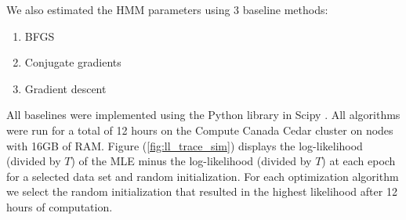 We also estimated the HMM parameters using 3 baseline methods:
%
\begin{enumerate}
    \item BFGS \citep{Fletcher:2000}
    \item Conjugate gradients \citep{Fletcher:1964}
    \item Gradient descent
\end{enumerate}
%
All baselines were implemented using the Python library in Scipy \citep{Virtanen:2019}.
%
All algorithms were run for a total of 12 hours on the Compute Canada Cedar cluster on nodes with 16GB of RAM.
%
Figure (\ref{fig:ll_trace_sim}) displays the log-likelihood (divided by $T$) of the MLE minus the log-likelihood (divided by $T$) at each epoch for a selected data set and random initialization. For each optimization algorithm we select the random initialization that resulted in the highest likelihood after 12 hours of computation.
%

